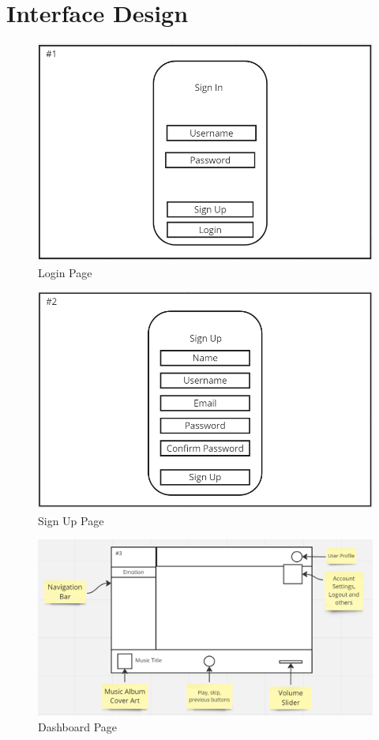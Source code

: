 \section{Interface Design}
\begin{figure}[!ht]
    \centering
    \includegraphics[width=12cm]{Images/login.png}
    \caption{Login Page}
    \label{fig:login}
\end{figure}
\begin{figure}[!ht]
    \centering
    \includegraphics[width=12cm]{Images/signup.png}
    \caption{Sign Up Page}
    \label{fig:signup}
\end{figure}
\begin{figure}[!ht]
    \centering
    \includegraphics[width=12cm]{Images/overview.png}
    \caption{Dashboard Page}
    \label{fig:dashboard}
\end{figure}
